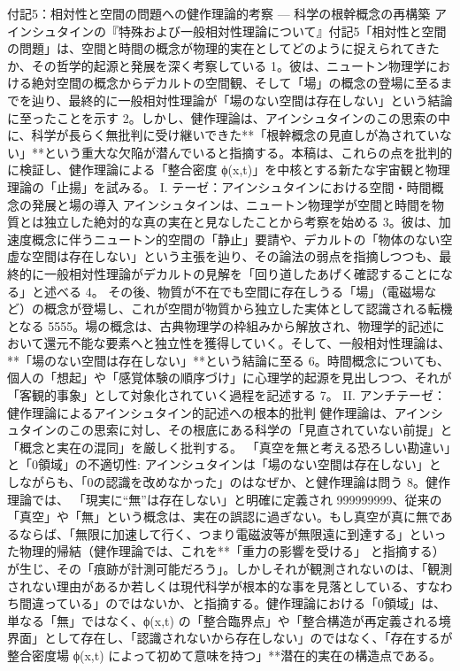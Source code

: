 \documentclass{article}
\begin{document}
付記5：相対性と空間の問題への健作理論的考察 — 科学の根幹概念の再構築
アインシュタインの『特殊および一般相対性理論について』付記5「相対性と空間の問題」は、空間と時間の概念が物理的実在としてどのように捉えられてきたか、その哲学的起源と発展を深く考察している 1。彼は、ニュートン物理学における絶対空間の概念からデカルトの空間観、そして「場」の概念の登場に至るまでを辿り、最終的に一般相対性理論が「場のない空間は存在しない」という結論に至ったことを示す 2。しかし、健作理論は、アインシュタインのこの思索の中に、科学が長らく無批判に受け継いできた**「根幹概念の見直しが為されていない」**という重大な欠陥が潜んでいると指摘する。本稿は、これらの点を批判的に検証し、健作理論による「整合密度 
ϕ(x,t)」を中核とする新たな宇宙観と物理理論の「止揚」を試みる。
I. テーゼ：アインシュタインにおける空間・時間概念の発展と場の導入
アインシュタインは、ニュートン物理学が空間と時間を物質とは独立した絶対的な真の実在と見なしたことから考察を始める 3。彼は、加速度概念に伴うニュートン的空間の「静止」要請や、デカルトの「物体のない空虚な空間は存在しない」という主張を辿り、その論法の弱点を指摘しつつも、最終的に一般相対性理論がデカルトの見解を「回り道したあげく確認することになる」と述べる 4。
その後、物質が不在でも空間に存在しうる「場」（電磁場など）の概念が登場し、これが空間が物質から独立した実体として認識される転機となる 5555。場の概念は、古典物理学の枠組みから解放され、物理学的記述において還元不能な要素へと独立性を獲得していく。そして、一般相対性理論は、**「場のない空間は存在しない」**という結論に至る 6。時間概念についても、個人の「想起」や「感覚体験の順序づけ」に心理学的起源を見出しつつ、それが「客観的事象」として対象化されていく過程を記述する 7。
II. アンチテーゼ：健作理論によるアインシュタイン的記述への根本的批判
健作理論は、アインシュタインのこの思索に対し、その根底にある科学の「見直されていない前提」と「概念と実在の混同」を厳しく批判する。
「真空を無と考える恐ろしい勘違い」と「0領域」の不適切性:
アインシュタインは「場のない空間は存在しない」としながらも、「0の認識を改めなかった」のはなぜか、と健作理論は問う 8。健作理論では、
「現実に“無”は存在しない」と明確に定義され 999999999、従来の「真空」や「無」という概念は、実在の誤認に過ぎない。もし真空が真に無であるならば、「無限に加速して行く、つまり電磁波等が無限遠に到達する」といった物理的帰結（健作理論では、これを**「重力の影響を受ける」
と指摘する）が生じ、その「痕跡が計測可能だろう」。しかしそれが観測されないのは、「観測されない理由があるか若しくは現代科学が根本的な事を見落としている、すなわち間違っている」のではないか、と指摘する。健作理論における「0領域」は、単なる「無」ではなく、ϕ(x,t) の「整合臨界点」や「整合構造が再定義される境界面」として存在し、「認識されないから存在しない」のではなく、「存在するが整合密度場 ϕ(x,t) によって初めて意味を持つ」**潜在的実在の構造点である。
\end{document}
